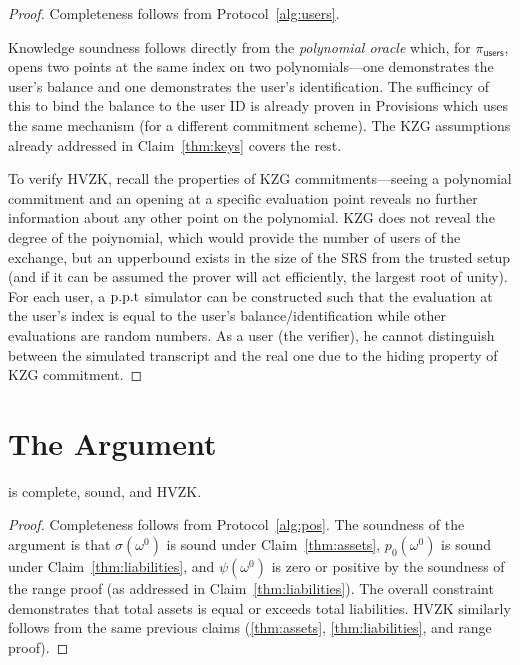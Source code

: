 \begin{proof}
Completeness follows from Protocol~\ref{alg:users}. 

Knowledge soundness follows directly from the \textit{polynomial oracle} which, for $\pi_\mathsf{users}$, opens two points at the same index on two polynomials---one demonstrates the user's balance and one demonstrates the user's identification. The sufficincy of this to bind the balance to the user ID is already proven in Provisions which uses the same mechanism (for a different commitment scheme). The KZG assumptions already addressed in Claim~\ref{thm:keys} covers the rest. 

To verify HVZK, recall the properties of KZG commitments---seeing a polynomial commitment and an opening at a specific evaluation point reveals no further information about any other point on the polynomial. KZG does not reveal the degree of the poiynomial, which would provide the number of users of the exchange, but an upperbound exists in the size of the SRS from the trusted setup (and if it can be assumed the prover will act efficiently, the largest root of unity). For each user, a $\text{p.p.t}$ simulator can be constructed such that the evaluation at the user's index is equal to the user's balance/identification while other evaluations are random numbers. As a user (the verifier), he cannot distinguish between the simulated transcript and the real one due to the hiding property of KZG commitment. \end{proof}


\section{The \pos Argument}


\begin{claim}
\label{thm:solvency} 
\pos is complete, sound, and HVZK. 
\end{claim}

\begin{proof}
Completeness follows from Protocol~\ref{alg:pos}. The soundness of the argument is that $\sigma(\omega^0)$ is sound under Claim~\ref{thm:assets}, $p_0(\omega^0)$ is sound under Claim~\ref{thm:liabilities}, and $\psi(\omega^0)$ is zero or positive by the soundness of the range proof (as addressed in Claim~\ref{thm:liabilities}). The overall constraint demonstrates that total assets is equal or exceeds total liabilities. HVZK similarly follows from the same previous claims (\ref{thm:assets}, \ref{thm:liabilities}, and range proof).\end{proof}

